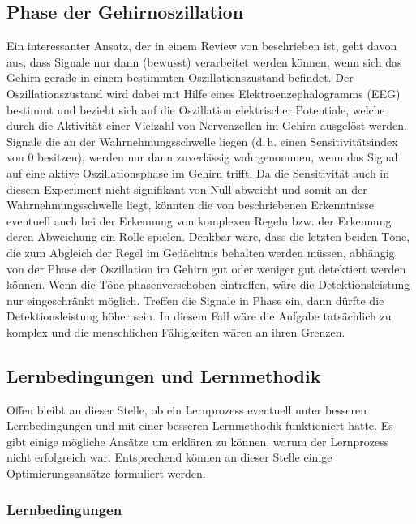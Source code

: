 \documentclass[doc,a4paper,12pt]{apa6}
\begin{document}
\subsection{Phase der Gehirnoszillation}

Ein interessanter Ansatz, der in einem Review von \textcite{vanrullen2011ongoing} beschrieben ist, geht davon aus, dass Signale nur dann (bewusst) verarbeitet werden können, wenn sich das Gehirn gerade in einem bestimmten Oszillationszustand befindet. Der Oszillationszustand wird dabei mit Hilfe eines Elektroenzephalogramms (EEG) bestimmt und bezieht sich auf die Oszillation elektrischer Potentiale, welche durch die Aktivität einer Vielzahl von Nervenzellen im Gehirn ausgelöst werden. Signale die an der Wahrnehmungsschwelle liegen (d.\,h. einen Sensitivitätsindex von 0 besitzen), werden nur dann zuverlässig wahrgenommen, wenn das Signal auf eine aktive Oszillationsphase im Gehirn trifft. Da die Sensitivität auch in diesem Experiment nicht signifikant von Null abweicht und somit an der Wahrnehmungsschwelle liegt, könnten die von \textcite{vanrullen2011ongoing} beschriebenen Erkenntnisse eventuell auch bei der Erkennung von komplexen Regeln bzw. der Erkennung deren Abweichung ein Rolle spielen. Denkbar wäre, dass die letzten beiden Töne, die zum Abgleich der Regel im Gedächtnis behalten werden müssen, abhängig von der Phase der Oszillation im Gehirn gut oder weniger gut detektiert werden können. Wenn die Töne phasenverschoben eintreffen, wäre die Detektionsleistung nur eingeschränkt möglich. Treffen die Signale in Phase ein, dann dürfte die Detektionsleistung höher sein. In diesem Fall wäre die Aufgabe tatsächlich zu komplex und die menschlichen Fähigkeiten wären an ihren Grenzen.

\subsection{Lernbedingungen und Lernmethodik}

Offen bleibt an dieser Stelle, ob ein Lernprozess eventuell unter besseren Lernbedingungen und mit einer besseren Lernmethodik funktioniert hätte. Es gibt einige mögliche Ansätze um erklären zu können, warum der Lernprozess nicht erfolgreich war. Entsprechend können an dieser Stelle einige Optimierungsansätze formuliert werden.

\subsubsection{Lernbedingungen}
\end{document}
